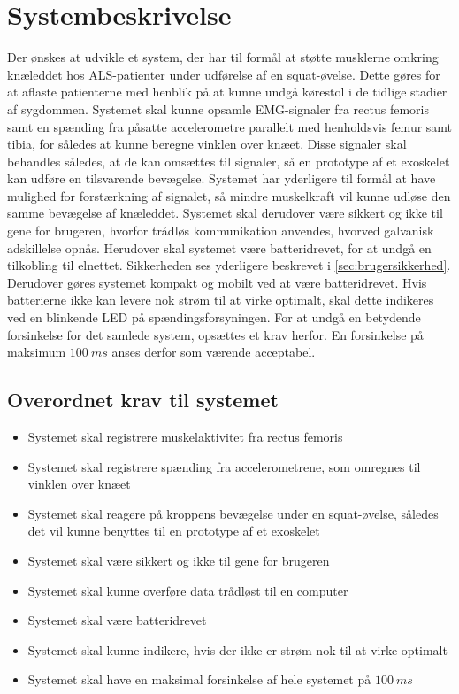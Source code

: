 \section{Systembeskrivelse}
Der ønskes at udvikle et system, der har til formål at støtte musklerne omkring knæleddet hos ALS-patienter under udførelse af en squat-øvelse. Dette gøres for at aflaste patienterne med henblik på at kunne undgå kørestol i de tidlige stadier af sygdommen. 
Systemet skal kunne opsamle EMG-signaler fra rectus femoris samt en spænding fra påsatte accelerometre parallelt med henholdsvis femur samt tibia, for således at kunne beregne vinklen over knæet. Disse signaler skal behandles således, at de kan omsættes til signaler, så en prototype af et exoskelet kan udføre en tilsvarende bevægelse. 
Systemet har yderligere til formål at have mulighed for forstærkning af signalet, så mindre muskelkraft vil kunne udløse den samme bevægelse af knæleddet. 
Systemet skal derudover være sikkert og ikke til gene for brugeren, hvorfor trådløs kommunikation anvendes, hvorved galvanisk adskillelse opnås. Herudover skal systemet være batteridrevet, for at undgå en tilkobling til elnettet. Sikkerheden ses yderligere beskrevet i \autoref{sec:brugersikkerhed}. Derudover gøres systemet kompakt og mobilt ved at være batteridrevet. Hvis batterierne ikke kan levere nok strøm til at virke optimalt, skal dette indikeres ved en blinkende LED på spændingsforsyningen. 
For at undgå en betydende forsinkelse for det samlede system, opsættes et krav herfor. En forsinkelse på maksimum $100~ms$ anses derfor som værende acceptabel. 

\subsection{Overordnet krav til systemet}  \label{sec:overordnet_krav}
\begin{itemize}
\item Systemet skal registrere muskelaktivitet fra rectus femoris 
\item Systemet skal registrere spænding fra accelerometrene, som omregnes til vinklen over knæet
\item Systemet skal reagere på kroppens bevægelse under en squat-øvelse, således det vil kunne benyttes til en prototype af et exoskelet
\item Systemet skal være sikkert og ikke til gene for brugeren 
\item Systemet skal kunne overføre data trådløst til en computer
\item Systemet skal være batteridrevet
\item Systemet skal kunne indikere, hvis der ikke er strøm nok til at virke optimalt
\item Systemet skal have en maksimal forsinkelse af hele systemet på $100~ms$
\end{itemize}


